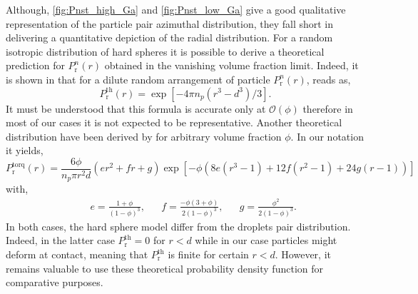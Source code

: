 Although, \ref{fig:Pnst_high_Ga} and \ref{fig:Pnst_low_Ga} give a good qualitative representation of the particle pair azimuthal distribution, they fall short in delivering a quantitative depiction of the radial distribution. %
For a random isotropic distribution of hard spheres it is possible to derive a theoretical prediction for $P_\text{r}^n(r)$ obtained in the vanishing volume fraction limit. 
Indeed, it is shown in \citet{zhang2021ensemble} that for a dilute random arrangement of particle $P_\text{r}^n(r)$, reads as, 
\begin{equation}
    P_\text{r}^\text{th}(r) = \exp[{-4 \pi n_p (r^3 - d^3)/3}].
    \label{eq:Pnst_dilute}
\end{equation}
It must be understood that this formula is accurate only at $\mathcal{O}(\phi)$ therefore in most of our cases it is not expected to be representative.
Another theoretical distribution have been derived by \citet{torquato1990nearest} for arbitrary volume fraction $\phi$. 
In our notation it yields, 
\begin{equation}
    P_\text{r}^\text{torq}(r) = 
        \frac{6 \phi}{n_p \pi r^2 d}
        (er^2+f r+g)
    \exp\left[-\phi(8e(r^3-1)+12 f(r^2-1)+24g(r-1))\right]
\end{equation}
with, 
\begin{align*}
    && e= \frac{1+\phi}{(1-\phi)^3},
    && f= \frac{-\phi (3+\phi)}{2(1-\phi)^3},
    && g= \frac{\phi^2}{2(1-\phi)^3}.
\end{align*}
In both cases, the hard sphere model differ from the droplets pair distribution.
Indeed, in the latter case $P_\text{r}^\text{th} = 0$ for $r<d$ while in our case particles might deform at contact, meaning that $P_\text{r}^\text{th}$ is finite for certain $r<d$. 
However, it remains valuable to use these theoretical probability density function for comparative purposes. 

